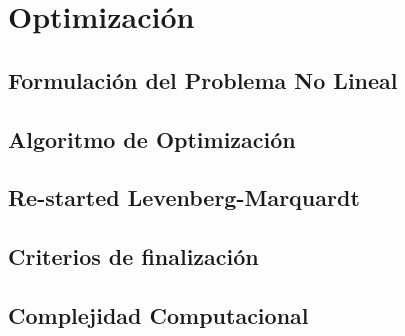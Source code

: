 \chapter{Optimización}


\section{Formulación del Problema No Lineal}


\section{Algoritmo de Optimización}


\section{Re-started Levenberg-Marquardt}


\section{Criterios de finalización}


\section{Complejidad Computacional}